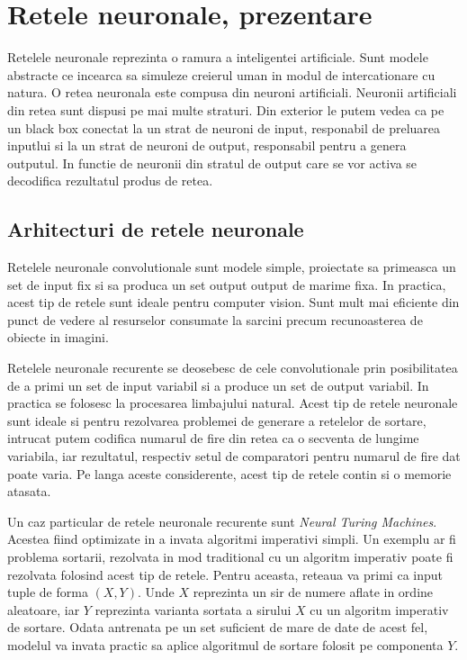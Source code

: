 \documentclass[12pt]{article}
\begin{document}
\section{Retele neuronale, prezentare}

Retelele neuronale reprezinta o ramura a inteligentei artificiale. Sunt modele abstracte ce incearca sa simuleze creierul uman
in modul de intercationare cu natura. O retea neuronala este compusa din neuroni artificiali. Neuronii artificiali din retea sunt dispusi pe mai multe straturi. Din exterior le putem vedea ca pe un black box conectat la un strat de neuroni de input, responabil de preluarea inputlui si la un strat de neuroni de output, responsabil pentru a genera outputul. In functie de neuronii din stratul de output care se vor activa se decodifica rezultatul produs de retea.

\subsection{Arhitecturi de retele neuronale}
Retelele neuronale convolutionale sunt modele simple, proiectate sa primeasca un set de input fix si sa produca un set output output de marime fixa. In practica, acest tip de retele sunt ideale pentru computer vision. Sunt mult mai eficiente din punct de vedere al resurselor consumate la sarcini precum recunoasterea de obiecte in imagini. 

Retelele neuronale recurente se deosebesc de cele convolutionale prin posibilitatea de a primi un set de input variabil si a produce un set de output variabil. In practica se folosesc la procesarea limbajului natural. Acest tip de retele neuronale sunt ideale si pentru rezolvarea problemei de generare a retelelor de sortare, intrucat putem codifica numarul de fire din retea ca o secventa de lungime variabila, iar rezultatul, respectiv setul de comparatori pentru numarul de fire dat poate varia. Pe langa aceste considerente, acest tip de retele contin si o memorie atasata.

Un caz particular de retele neuronale recurente sunt \textit{Neural Turing Machines}. Acestea fiind optimizate in a invata algoritmi imperativi simpli. Un exemplu ar fi problema sortarii, rezolvata in mod traditional cu un algoritm imperativ poate fi rezolvata folosind acest tip de retele. Pentru aceasta, reteaua va primi ca input tuple de forma $(X, Y)$. Unde $X$ reprezinta un sir de numere aflate in ordine aleatoare, iar $Y$ reprezinta varianta sortata a sirului $X$ cu un algoritm imperativ de sortare. Odata antrenata pe un set suficient de mare de date de acest fel, modelul va invata practic sa aplice algoritmul de sortare folosit pe componenta $Y$. 
\end{document}
